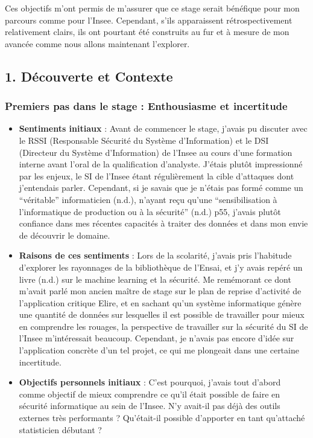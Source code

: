 \documentclass[
  letterpaper,
  DIV=11,
  numbers=noendperiod]{scrartcl}
\begin{document}
Ces objectifs m'ont permis de m'assurer que ce stage serait bénéfique
pour mon parcours comme pour l'Insee. Cependant, s'ils apparaissent
rétrospectivement relativement clairs, ils ont pourtant été construits
au fur et à mesure de mon avancée comme nous allons maintenant
l'explorer.

\subsection{1. Découverte et Contexte}\label{duxe9couverte-et-contexte}

\subsubsection{Premiers pas dans le stage : Enthousiasme et
incertitude}\label{premiers-pas-dans-le-stage-enthousiasme-et-incertitude}

\begin{itemize}
\item
  \textbf{Sentiments initiaux} : Avant de commencer le stage, j'avais pu
  discuter avec le RSSI (Responsable Sécurité du Système d'Information)
  et le DSI (Directeur du Système d'Information) de l'Insee au cours
  d'une formation interne avant l'oral de la qualification d'analyste.
  J'étais plutôt impressionné par les enjeux, le SI de l'Insee étant
  régulièrement la cible d'attaques dont j'entendais parler. Cependant,
  si je savais que je n'étais pas formé comme un ``véritable''
  informaticien (n.d.), n'ayant reçu qu'une ``sensibilisation à
  l'informatique de production ou à la sécurité'' (n.d.) p55, j'avais
  plutôt confiance dans mes récentes capacités à traiter des données et
  dans mon envie de découvrir le domaine.
\item
  \textbf{Raisons de ces sentiments} : Lors de la scolarité, j'avais
  pris l'habitude d'explorer les rayonnages de la bibliothèque de
  l'Ensai, et j'y avais repéré un livre (n.d.) sur le machine learning
  et la sécurité. Me remémorant ce dont m'avait parlé mon ancien maître
  de stage sur le plan de reprise d'activité de l'application critique
  Elire, et en sachant qu'un système informatique génère une quantité de
  données sur lesquelles il est possible de travailler pour mieux en
  comprendre les rouages, la perspective de travailler sur la sécurité
  du SI de l'Insee m'intéressait beaucoup. Cependant, je n'avais pas
  encore d'idée sur l'application concrète d'un tel projet, ce qui me
  plongeait dans une certaine incertitude.
\item
  \textbf{Objectifs personnels initiaux} : C'est pourquoi, j'avais tout
  d'abord comme objectif de mieux comprendre ce qu'il était possible de
  faire en sécurité informatique au sein de l'Insee. N'y avait-il pas
  déjà des outils externes très performants ? Qu'était-il possible
  d'apporter en tant qu'attaché statisticien débutant ?
\end{itemize}
\end{document}
